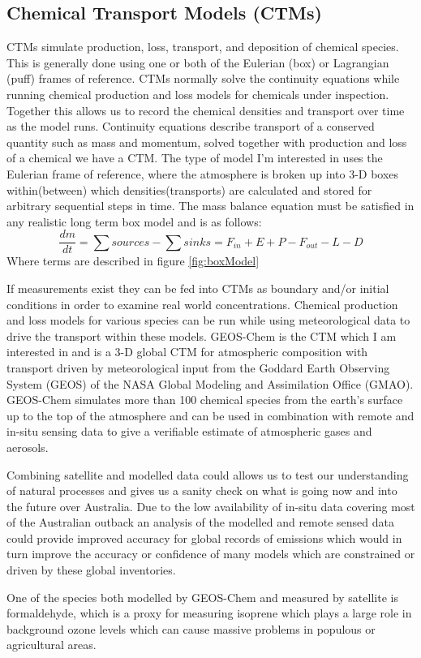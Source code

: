 \subsection{Chemical Transport Models (CTMs)}
CTMs simulate production, loss, transport, and deposition of chemical species.
This is generally done using one or both of the Eulerian (box) or Lagrangian (puff) frames of reference.
CTMs normally solve the continuity equations while running chemical production and loss models for chemicals under inspection. Together this allows us to record the chemical densities and transport over time as the model runs.
Continuity equations describe transport of a conserved quantity such as mass and momentum, solved together with production and loss of a chemical we have a CTM.
The type of model I'm interested in uses the Eulerian frame of reference, where the atmosphere is broken up into 3-D boxes within(between) which densities(transports) are calculated and stored for arbitrary sequential steps in time.
The mass balance equation must be satisfied in any realistic long term box model and is as follows: 
$$ \frac{dm}{dt} = \sum{sources}-\sum{sinks} = F_{in} + E + P - F_{out} - L - D $$
Where terms are described in figure \ref{fig:boxModel}

If measurements exist they can be fed into CTMs as boundary and/or initial conditions in order to examine real world concentrations.
Chemical production and loss models for various species can be run while using meteorological data to drive the transport within these models.
GEOS-Chem is the CTM which I am interested in and is a 3-D global CTM for atmospheric composition with transport driven by meteorological input from the Goddard Earth Observing System (GEOS) of the NASA Global Modeling and Assimilation Office (GMAO).
GEOS-Chem simulates more than 100 chemical species from the earth's surface up to the top of the atmosphere and can be used in combination with remote and in-situ sensing data to give a verifiable estimate of atmospheric gases and aerosols.

Combining satellite and modelled data could allows us to test our understanding of natural processes and gives us a sanity check on what is going now and into the future over Australia.
Due to the low availability of in-situ data covering most of the Australian outback an analysis of the modelled and remote sensed data could provide improved accuracy for global records of emissions which would in turn improve the accuracy or confidence of many models which are constrained or driven by these global inventories.

One of the species both modelled by GEOS-Chem and measured by satellite is formaldehyde, which is a proxy for measuring isoprene which plays a large role in background ozone levels which can cause massive problems in populous or agricultural areas.